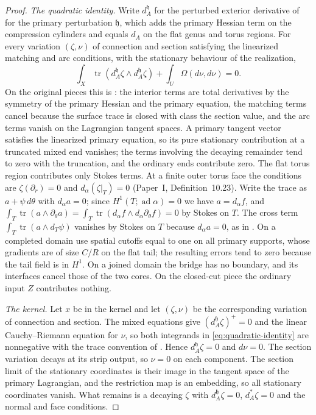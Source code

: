 \documentclass[11pt]{amsart}
\theoremstyle{definition}
\theoremstyle{remark}
\theoremstyle{plain}
\numberwithin{equation}{section}
\newcommand{\ad}{\operatorname{ad}}
\newcommand{\tr}{\operatorname{tr}}
\begin{document}
\begin{proof}
\emph{The quadratic identity.} Write $d^{\mathfrak h}_A$ for the perturbed exterior
derivative of \cite[(4.42)]{DFL} for the primary perturbation $\mathfrak h$, which adds the primary Hessian term on
the compression cylinders and equals $d_A$ on the flat genus and torus
regions. For every variation $(\zeta,\nu)$ of connection and section satisfying the
linearized matching and arc conditions, with the stationary behaviour of
the realization,
\begin{equation}\label{eq:quadratic-identity}
 \int_X\tr(d^{\mathfrak h}_A\zeta\wedge d^{\mathfrak h}_A\zeta)+\int_U\Omega(d\nu,d\nu)=0 .
\end{equation}
On the original pieces this is \cite[Lemma~4.40]{DFL}: the interior terms
are total derivatives by the symmetry of the primary Hessian and the
primary equation, the matching terms cancel because the surface trace is
closed with class the section value, and the arc terms vanish on the
Lagrangian tangent spaces. A primary tangent vector satisfies the
linearized primary equation, so its pure stationary contribution at a
truncated mixed end vanishes; the terms involving the decaying remainder
tend to zero with the truncation, and the ordinary ends contribute zero.
The flat torus region contributes only Stokes terms. At a finite outer
torus face the conditions are $\zeta(\partial_r)=0$ and
$d_\alpha(\zeta|_T)=0$ (Paper~I, Definition~10.23). Write the trace as
$a+\psi\,d\theta$ with $d_\alpha a=0$; since $H^1(T;\ad\alpha)=0$ we have
$a=d_\alpha f$, and
$\int_T\tr(a\wedge\partial_\theta a)=\int_T\tr(d_\alpha f\wedge
d_\alpha\partial_\theta f)=0$ by Stokes on $T$. The cross term
$\int_T\tr(a\wedge d_T\psi)$ vanishes by Stokes on $T$ because
$d_\alpha a=0$, as in \cite[(4.52)]{DFL}. On a completed domain use spatial
cutoffs equal to one on all primary supports, whose gradients are of
size $C/R$ on the flat tail; the resulting errors tend to zero because
the tail field is in $H^1$. On a joined domain the bridge has no
boundary, and its interfaces cancel those of the two cores. On the
closed-cut piece the ordinary input $Z$ contributes nothing.

\emph{The kernel.} Let $x$ be in the kernel and let $(\zeta,\nu)$ be the
corresponding variation of connection and section. The mixed equations give $(d^{\mathfrak h}_A\zeta)^+=0$ and the
linear Cauchy--Riemann equation for $\nu$, so both integrands in
\eqref{eq:quadratic-identity} are nonnegative with the trace convention
of \cite{DFL}. Hence $d^{\mathfrak h}_A\zeta=0$ and $d\nu=0$. The section variation
decays at its strip output, so $\nu=0$ on each component. The section
limit of the stationary coordinates is their image in the tangent space
of the primary Lagrangian, and the restriction map is an embedding, so
all stationary coordinates vanish. What remains is a decaying $\zeta$
with $d^{\mathfrak h}_A\zeta=0$, $d_A^*\zeta=0$ and the normal and face conditions.


\end{proof}
\end{document}

